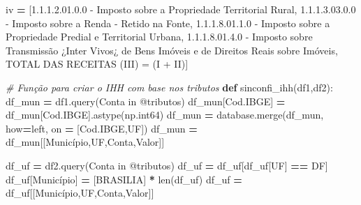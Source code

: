 \documentclass[
  12,
  dvipsnames]{article}
\newenvironment{Shaded}{\begin{snugshade}}{\end{snugshade}}
\newcommand{\BuiltInTok}[1]{#1}
\newcommand{\CommentTok}[1]{\textcolor[rgb]{0.56,0.35,0.01}{\textit{#1}}}
\newcommand{\KeywordTok}[1]{\textcolor[rgb]{0.13,0.29,0.53}{\textbf{#1}}}
\newcommand{\NormalTok}[1]{#1}
\newcommand{\OperatorTok}[1]{\textcolor[rgb]{0.81,0.36,0.00}{\textbf{#1}}}
\newcommand{\StringTok}[1]{\textcolor[rgb]{0.31,0.60,0.02}{#1}}
\begin{document}
\begin{Shaded}
\begin{Highlighting}[]
\NormalTok{iv }\OperatorTok{=}\NormalTok{ [}\StringTok{\textquotesingle{}1.1.1.2.01.0.0 {-} Imposto sobre a Propriedade Territorial Rural\textquotesingle{}}\NormalTok{,}
      \StringTok{\textquotesingle{}1.1.1.3.03.0.0 {-} Imposto sobre a Renda {-} Retido na Fonte\textquotesingle{}}\NormalTok{,}
      \StringTok{\textquotesingle{}1.1.1.8.01.1.0 {-} Imposto sobre a Propriedade Predial e Territorial Urbana\textquotesingle{}}\NormalTok{,}
      \StringTok{\textquotesingle{}1.1.1.8.01.4.0 {-} Imposto sobre Transmissão ¿Inter Vivos¿ de Bens Imóveis e de Direitos Reais sobre Imóveis\textquotesingle{}}\NormalTok{,}
      \StringTok{\textquotesingle{}TOTAL DAS RECEITAS (III) = (I + II)\textquotesingle{}}\NormalTok{]}

\CommentTok{\# Função para criar o IHH com base nos tributos}
\KeywordTok{def}\NormalTok{ sinconfi\_ihh(df1,df2):}
\NormalTok{    df\_mun }\OperatorTok{=}\NormalTok{ df1.query(}\StringTok{\textquotesingle{}Conta in @tributos\textquotesingle{}}\NormalTok{)}
\NormalTok{    df\_mun[}\StringTok{\textquotesingle{}Cod.IBGE\textquotesingle{}}\NormalTok{] }\OperatorTok{=}\NormalTok{ df\_mun[}\StringTok{\textquotesingle{}Cod.IBGE\textquotesingle{}}\NormalTok{].astype(np.int64)}
\NormalTok{    df\_mun }\OperatorTok{=}\NormalTok{ database.merge(df\_mun, how}\OperatorTok{=}\StringTok{\textquotesingle{}left\textquotesingle{}}\NormalTok{, on }\OperatorTok{=}\NormalTok{ [}\StringTok{\textquotesingle{}Cod.IBGE\textquotesingle{}}\NormalTok{,}\StringTok{\textquotesingle{}UF\textquotesingle{}}\NormalTok{])}
\NormalTok{    df\_mun }\OperatorTok{=}\NormalTok{ df\_mun[[}\StringTok{\textquotesingle{}Município\textquotesingle{}}\NormalTok{,}\StringTok{\textquotesingle{}UF\textquotesingle{}}\NormalTok{,}\StringTok{\textquotesingle{}Conta\textquotesingle{}}\NormalTok{,}\StringTok{\textquotesingle{}Valor\textquotesingle{}}\NormalTok{]]}
    
\NormalTok{    df\_uf }\OperatorTok{=}\NormalTok{ df2.query(}\StringTok{\textquotesingle{}Conta in @tributos\textquotesingle{}}\NormalTok{)}
\NormalTok{    df\_uf }\OperatorTok{=}\NormalTok{ df\_uf[df\_uf[}\StringTok{\textquotesingle{}UF\textquotesingle{}}\NormalTok{] }\OperatorTok{==} \StringTok{\textquotesingle{}DF\textquotesingle{}}\NormalTok{]}
\NormalTok{    df\_uf[}\StringTok{\textquotesingle{}Município\textquotesingle{}}\NormalTok{] }\OperatorTok{=}\NormalTok{ [}\StringTok{\textquotesingle{}BRASILIA\textquotesingle{}}\NormalTok{] }\OperatorTok{*} \BuiltInTok{len}\NormalTok{(df\_uf)}
\NormalTok{    df\_uf }\OperatorTok{=}\NormalTok{ df\_uf[[}\StringTok{\textquotesingle{}Município\textquotesingle{}}\NormalTok{,}\StringTok{\textquotesingle{}UF\textquotesingle{}}\NormalTok{,}\StringTok{\textquotesingle{}Conta\textquotesingle{}}\NormalTok{,}\StringTok{\textquotesingle{}Valor\textquotesingle{}}\NormalTok{]]}
    

\end{Highlighting}
\end{Shaded}
\end{document}
